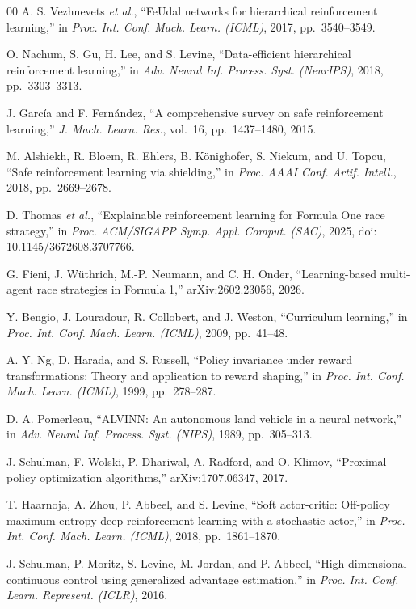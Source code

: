 \documentclass{ieeeaccess}
\begin{document}
\begin{thebibliography}{00}
 A. S. Vezhnevets \emph{et al.}, ``FeUdal networks for hierarchical reinforcement learning,'' in \emph{Proc. Int. Conf. Mach. Learn. (ICML)}, 2017, pp.~3540--3549.

 O. Nachum, S. Gu, H. Lee, and S. Levine, ``Data-efficient hierarchical reinforcement learning,'' in \emph{Adv. Neural Inf. Process. Syst. (NeurIPS)}, 2018, pp.~3303--3313.

 J. García and F. Fernández, ``A comprehensive survey on safe reinforcement learning,'' \emph{J. Mach. Learn. Res.}, vol.~16, pp.~1437--1480, 2015.

 M. Alshiekh, R. Bloem, R. Ehlers, B. Könighofer, S. Niekum, and U. Topcu, ``Safe reinforcement learning via shielding,'' in \emph{Proc. AAAI Conf. Artif. Intell.}, 2018, pp.~2669--2678.

 D. Thomas \emph{et al.}, ``Explainable reinforcement learning for Formula One race strategy,'' in \emph{Proc. ACM/SIGAPP Symp. Appl. Comput. (SAC)}, 2025, doi: 10.1145/3672608.3707766.

 G. Fieni, J. Wüthrich, M.-P. Neumann, and C. H. Onder, ``Learning-based multi-agent race strategies in Formula 1,'' arXiv:2602.23056, 2026.

 Y. Bengio, J. Louradour, R. Collobert, and J. Weston, ``Curriculum learning,'' in \emph{Proc. Int. Conf. Mach. Learn. (ICML)}, 2009, pp.~41--48.

 A. Y. Ng, D. Harada, and S. Russell, ``Policy invariance under reward transformations: Theory and application to reward shaping,'' in \emph{Proc. Int. Conf. Mach. Learn. (ICML)}, 1999, pp.~278--287.

 D. A. Pomerleau, ``ALVINN: An autonomous land vehicle in a neural network,'' in \emph{Adv. Neural Inf. Process. Syst. (NIPS)}, 1989, pp.~305--313.

 J. Schulman, F. Wolski, P. Dhariwal, A. Radford, and O. Klimov, ``Proximal policy optimization algorithms,'' arXiv:1707.06347, 2017.

 T. Haarnoja, A. Zhou, P. Abbeel, and S. Levine, ``Soft actor-critic: Off-policy maximum entropy deep reinforcement learning with a stochastic actor,'' in \emph{Proc. Int. Conf. Mach. Learn. (ICML)}, 2018, pp.~1861--1870.

 J. Schulman, P. Moritz, S. Levine, M. Jordan, and P. Abbeel, ``High-dimensional continuous control using generalized advantage estimation,'' in \emph{Proc. Int. Conf. Learn. Represent. (ICLR)}, 2016.


\end{thebibliography}
\end{document}
